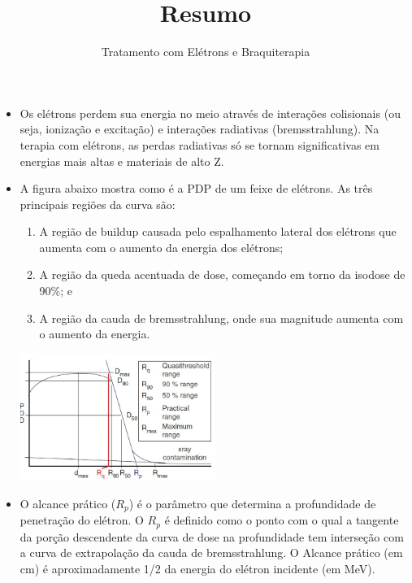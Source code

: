 \documentclass[11pt,a4paper]{article}
\title{\LobsterTwo\Huge{Resumo}}
\author{\LobsterTwo\Large{Tratamento com Elétrons e Braquiterapia \nocite{*}}}
\date{\LobsterTwo{Dalila Mendonça}}
\newcounter{exemplo}
\begin{document}
	\maketitle


\begin{exemplo}
    \begin{itemize}
        \item Os elétrons perdem sua energia no meio através de interações colisionais (ou seja, ionização e excitação) e interações radiativas (bremsstrahlung). Na terapia com elétrons, as perdas radiativas só se tornam significativas em energias mais altas e materiais de alto Z.
        
        \item A figura abaixo mostra como é a PDP de um feixe de elétrons. As três principais regiões da curva são:
        
            \begin{enumerate}[label=label=\textcolor{CarnationPink}{\roman*.}]
                \item A região de buildup causada pelo espalhamento lateral dos elétrons que aumenta com o aumento da energia dos elétrons;
                \item A região da queda acentuada de dose, começando em torno da isodose de 90\%; e 
                \item A região da cauda de bremsstrahlung, onde sua magnitude aumenta com o aumento da energia.
            \end{enumerate}
        
            \begin{center}
                \includegraphics[width=0.5\textwidth]{Imagens/pdpEletrons.JPG}
            \end{center}

        \item O alcance prático ($R_p$) é o parâmetro que determina a profundidade de penetração do elétron. O $R_p$ é definido como o ponto com o qual a tangente da porção descendente da curva de dose na profundidade tem interseção com a curva de extrapolação da cauda de bremsstrahlung. O Alcance prático (em cm) é aproximadamente 1/2 da energia do elétron incidente (em MeV).
        

\end{itemize}
\end{exemplo}
\end{document}
